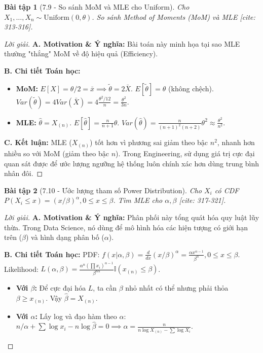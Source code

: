 \documentclass[8pt,a4paper]{article}
\newtheorem{exercise}{Bài tập}
\newenvironment{solution}{\begin{proof}[Lời giải]}{\end{proof}}
\begin{document}
\begin{exercise}[7.9 - So sánh MoM và MLE cho Uniform]
Cho $X_1, \dots, X_n \sim \text{Uniform}(0, \theta)$. So sánh Method of Moments (MoM) và MLE [cite: 313-316].
\end{exercise}

\begin{solution}
\textbf{A. Motivation \& Ý nghĩa:} Bài toán này minh họa tại sao MLE thường "thắng" MoM về độ hiệu quả (Efficiency).

\textbf{B. Chi tiết Toán học:}
\begin{itemize}
    \item \textbf{MoM:} $E[X] = \theta/2 = \bar{x} \implies \tilde{\theta} = 2\bar{X}$.
    $E[\tilde{\theta}] = \theta$ (không chệch). $Var(\tilde{\theta}) = 4 Var(\bar{X}) = 4 \frac{\theta^2/12}{n} = \frac{\theta^2}{3n}$.
    \item \textbf{MLE:} $\hat{\theta} = X_{(n)}$. 
    $E[\hat{\theta}] = \frac{n}{n+1}\theta$. $Var(\hat{\theta}) = \frac{n}{(n+1)^2(n+2)}\theta^2 \approx \frac{\theta^2}{n^2}$.
\end{itemize}
\textbf{C. Kết luận:} MLE ($X_{(n)}$) tốt hơn vì phương sai giảm theo bậc $n^2$, nhanh hơn nhiều so với MoM (giảm theo bậc $n$). Trong Engineering, sử dụng giá trị cực đại quan sát được để ước lượng ngưỡng hệ thống luôn chính xác hơn dùng trung bình nhân đôi.
\end{solution}

\begin{exercise}[7.10 - Ước lượng tham số Power Distribution]
Cho $X_i$ có CDF $P(X_i \le x) = (x/\beta)^\alpha, 0 \le x \le \beta$. Tìm MLE cho $\alpha, \beta$ [cite: 317-321].
\end{exercise}

\begin{solution}
\textbf{A. Motivation \& Ý nghĩa:} Phân phối này tổng quát hóa quy luật lũy thừa. Trong Data Science, nó dùng để mô hình hóa các hiện tượng có giới hạn trên ($\beta$) và hình dạng phân bố ($\alpha$).

\textbf{B. Chi tiết Toán học:}
PDF: $f(x|\alpha, \beta) = \frac{d}{dx} (x/\beta)^\alpha = \frac{\alpha x^{\alpha-1}}{\beta^\alpha}, 0 \le x \le \beta$.
Likelihood: $L(\alpha, \beta) = \frac{\alpha^n (\prod x_i)^{\alpha-1}}{\beta^{n\alpha}} \mathbb{I}(x_{(n)} \le \beta)$.
\begin{itemize}
    \item \textbf{Với $\beta$:} Để cực đại hóa $L$, ta cần $\beta$ nhỏ nhất có thể nhưng phải thỏa $\beta \ge x_{(n)}$. Vậy $\hat{\beta} = X_{(n)}$.
    \item \textbf{Với $\alpha$:} Lấy log và đạo hàm theo $\alpha$: 
    $n/\alpha + \sum \log x_i - n \log \hat{\beta} = 0 \implies \hat{\alpha} = \frac{n}{n \log X_{(n)} - \sum \log X_i}$.
\end{itemize}
\end{solution}
\end{document}
